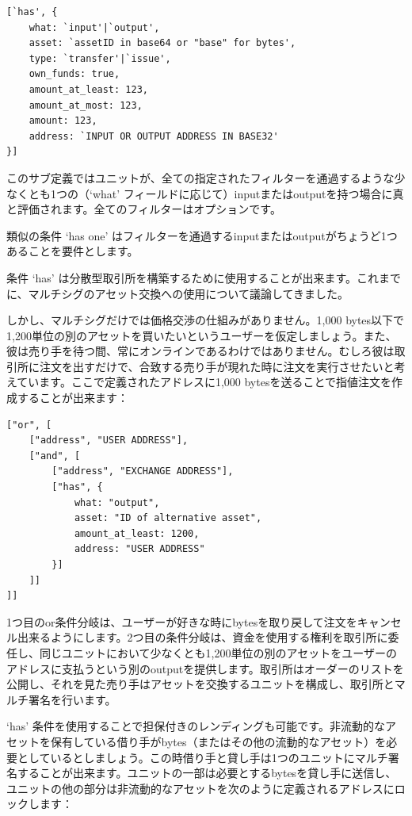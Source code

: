 \documentclass[a4paper, dvipdfmx]{jsarticle}
\begin{document}
\begin{lstlisting}[basicstyle=\ttfamily\footnotesize, frame=none]
[`has', {
    what: `input'|`output',
    asset: `assetID in base64 or "base" for bytes',
    type: `transfer'|`issue',
    own_funds: true,
    amount_at_least: 123,
    amount_at_most: 123,
    amount: 123,
    address: `INPUT OR OUTPUT ADDRESS IN BASE32'
}]
\end{lstlisting}

\noindent このサブ定義ではユニットが、全ての指定されたフィルターを通過するような少なくとも1つの（`what' フィールドに応じて）inputまたはoutputを持つ場合に真と評価されます。全てのフィルターはオプションです。

類似の条件 `has one' はフィルターを通過するinputまたはoutputがちょうど1つあることを要件とします。

条件 `has' は分散型取引所を構築するために使用することが出来ます。これまでに、マルチシグのアセット交換への使用について議論してきました。

しかし、マルチシグだけでは価格交渉の仕組みがありません。1,000 bytes以下で1,200単位の別のアセットを買いたいというユーザーを仮定しましょう。また、彼は売り手を待つ間、常にオンラインであるわけではありません。むしろ彼は取引所に注文を出すだけで、合致する売り手が現れた時に注文を実行させたいと考えています。ここで定義されたアドレスに1,000 bytesを送ることで指値注文を作成することが出来ます：

\begin{lstlisting}[basicstyle=\ttfamily\footnotesize, frame=none]
["or", [
    ["address", "USER ADDRESS"],
    ["and", [
        ["address", "EXCHANGE ADDRESS"],
        ["has", {
            what: "output",
            asset: "ID of alternative asset",
            amount_at_least: 1200,
            address: "USER ADDRESS"
        }]
    ]]
]]
\end{lstlisting}

\noindent 1つ目のor条件分岐は、ユーザーが好きな時にbytesを取り戻して注文をキャンセル出来るようにします。2つ目の条件分岐は、資金を使用する権利を取引所に委任し、同じユニットにおいて少なくとも1,200単位の別のアセットをユーザーのアドレスに支払うという別のoutputを提供します。取引所はオーダーのリストを公開し、それを見た売り手はアセットを交換するユニットを構成し、取引所とマルチ署名を行います。

‘has’ 条件を使用することで担保付きのレンディングも可能です。非流動的なアセットを保有している借り手がbytes（またはその他の流動的なアセット）を必要としているとしましょう。この時借り手と貸し手は1つのユニットにマルチ署名することが出来ます。ユニットの一部は必要とするbytesを貸し手に送信し、ユニットの他の部分は非流動的なアセットを次のように定義されるアドレスにロックします：
\end{document}
